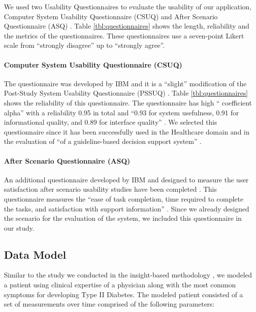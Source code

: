 \documentclass[twocolumn]{bmcart}%
\begin{document}
We used two Usability Questionnaires to evaluate the usability of our application, Computer System Usability Questionnaire (CSUQ) and After Scenario Questionnaire (ASQ) \cite{lewis1995ibm}. Table \ref{tbl:questionnaires} shows the length, reliability and the metrics of the questionnaires. These questionnaires use a seven-point Likert scale from ``strongly disagree'' up to ``strongly agree''.

\paragraph*{Computer System Usability Questionnaire (CSUQ)} The questionnaire was developed by IBM and it is a ``slight'' modification of the Post-Study System Usability Questionnaire (PSSUQ) \cite{lewis1992psychometric}. Table \ref{tbl:questionnaires} shows the reliability of this questionnaire. The questionnaire has high `` coefficient alpha'' with a reliability 0.95 in total and ``0.93 for system usefulness, 0.91 for informational quality, and 0.89 for interface quality''  \cite{johnson2011ehr, lewis1995ibm, lewis1992psychometric}. We selected this questionnaire since it has been successfully used in the Healthcare domain \cite{johnson2011ehr, jaspers2008pre} and in the evaluation of ``of a guideline-based decision support system'' \cite{johnson2011ehr, goud2008subjective}.

\paragraph*{After Scenario Questionnaire (ASQ)} An additional questionnaire developed by IBM \cite{johnson2011ehr, lewis1995ibm, lewis1991psychometric} and designed to measure the user satisfaction after scenario usability studies have been completed \cite{johnson2011ehr, lewis1992psychometric, bangor2008empirical}. This questionnaire measures the ``ease of task completion, time required to complete the tasks, and satisfaction with support information'' \cite{johnson2011ehr}. Since we already designed the scenario for the evaluation of the system, we included this questionnaire in our study.

\subsection*{Data Model}

Similar to the study we conducted in the insight-based methodology \citep{EMBCLedNiem}, we modeled a patient using clinical expertise of a physician along with the most common symptoms for developing Type II Diabetes. The modeled patient consisted of a set of measurements over time comprised of the following parameters:
\end{document}
